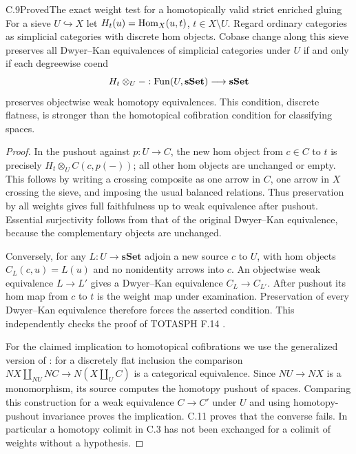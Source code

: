 \begin{statement}{C.9}{Proved}{The exact weight test for a homotopically valid strict enriched gluing}
For a sieve $U\hookrightarrow X$ let $H_t(u)=\operatorname{Hom}_X(u,t)$, $t\in X\setminus U$. Regard ordinary categories as simplicial categories with discrete hom objects. Cobase change along this sieve preserves all Dwyer--Kan equivalences of simplicial categories under $U$ if and only if each degreewise coend
\[
 H_t\otimes_U-:\operatorname{Fun}(U,\mathbf{sSet})\longrightarrow\mathbf{sSet}
\]
preserves objectwise weak homotopy equivalences. This condition, discrete flatness, is stronger than the homotopical cofibration condition for classifying spaces.
\end{statement}
\begin{proof}
In the pushout against $p:U\to C$, the new hom object from $c\in C$ to $t$ is precisely $H_t\otimes_U C(c,p(-))$; all other hom objects are unchanged or empty. This follows by writing a crossing composite as one arrow in $C$, one arrow in $X$ crossing the sieve, and imposing the usual balanced relations. Thus preservation by all weights gives full faithfulness up to weak equivalence after pushout. Essential surjectivity follows from that of the original Dwyer--Kan equivalence, because the complementary objects are unchanged.

Conversely, for any $L:U\to\mathbf{sSet}$ adjoin a new source $c$ to $U$, with hom objects $C_L(c,u)=L(u)$ and no nonidentity arrows into $c$. An objectwise weak equivalence $L\to L'$ gives a Dwyer--Kan equivalence $C_L\to C_{L'}$. After pushout its hom map from $c$ to $t$ is the weight map under examination. Preservation of every Dwyer--Kan equivalence therefore forces the asserted condition. This independently checks the proof of TOTASPH F.14 \citep{CDTOTASPH2026}.

For the claimed implication to homotopical cofibrations we use the generalized version of \citet[Theorem~1.5, \S4, p.~2180]{CDHORR2024}: for a discretely flat inclusion the comparison $NX\amalg_{NU}NC\to N(X\amalg_U C)$ is a categorical equivalence. Since $NU\to NX$ is a monomorphism, its source computes the homotopy pushout of spaces. Comparing this construction for a weak equivalence $C\to C'$ under $U$ and using homotopy-pushout invariance proves the implication. C.11 proves that the converse fails. In particular a homotopy colimit in C.3 has not been exchanged for a colimit of weights without a hypothesis.
\end{proof}

